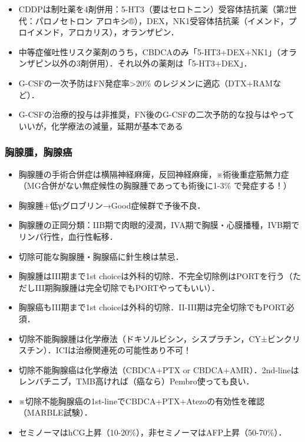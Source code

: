 \begin{itemize}
\item CDDPは制吐薬を4剤併用：5-HT3（要はセロトニン）受容体拮抗薬（第2世代：パロノセトロン アロキシ®），DEX，NK1受容体拮抗薬（イメンド，プロイメンド，アロカリス），オランザピン．
\item 中等症催吐性リスク薬剤のうち，CBDCAのみ「5-HT3+DEX+NK1」（オランザピン以外の3剤併用）．それ以外の薬剤は「5-HT3+DEX」．
\item G-CSFの一次予防はFN発症率>20\% のレジメンに適応（DTX+RAMなど）．
\item G-CSFの治療的投与は非推奨，FN後のG-CSFの二次予防的な投与はやっていいが，化学療法の減量，延期が基本である
\end{itemize}

\subsubsection{胸腺腫，胸腺癌}

\begin{itemize}
\item 胸腺腫の手術合併症は横隔神経麻痺，反回神経麻痺，※術後重症筋無力症（MG合併がない無症候性の胸腺腫であっても術後に1-3\% で発症する！）
\item 胸腺腫+低γグロブリン→Good症候群で予後不良．
\item 胸腺腫の正岡分類：IIB期で肉眼的浸潤，IVA期で胸膜・心膜播種，IVB期でリンパ行性，血行性転移．


\item 切除可能な胸腺腫・胸腺癌に針生検は禁忌．
\item 胸腺腫はIII期まで1st choiceは外科的切除．不完全切除例はPORTを行う（ただしIII期胸腺腫は完全切除でもPORTやってもいい）．
\item 胸腺癌もIII期まで1st choiceは外科的切除．II-III期は完全切除でもPORT必須．
\item 切除不能胸腺腫は化学療法（ドキソルビシン，シスプラチン，CY±ビンクリスチン）．ICIは治療関連死の可能性あり不可！
\item 切除不能胸腺癌は化学療法（CBDCA+PTX or CBDCA+AMR）．2nd-lineはレンバチニブ，TMB高ければ（癌なら）Pembro使っても良い．
\item ※切除不能胸腺癌の1st-lineでCBDCA+PTX+Atezoの有効性を確認（MARBLE試験）．
\item セミノーマはhCG上昇（10-20\%），非セミノーマはAFP上昇（50-70\%）．
\end{itemize}


